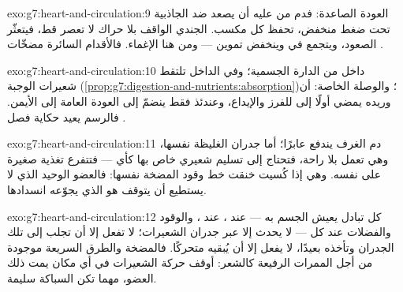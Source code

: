 \begin{solution}{exo:g7:heart-and-circulation:9}
العودة الصاعدة: فدم  من  عليه أن يصعد ضد الجاذبية
تحت ضغط منخفض،  تحفظ كل مكسب.   الجندي الواقف
بلا حراك لا تعصر  قط، فيتعثّر الصعود، ويتجمع  في
 وينخفض تموين  --- ومن هنا الإغماء. فالأقدام السائرة
مضخّات .
\end{solution}

\begin{solution}{exo:g7:heart-and-circulation:10}
 داخل من الدارة الجسمية؛ وفي الداخل تلتقط شعيرات 
 الوجبة
(\cref{prop:g7:digestion-and-nutrients:absorption})؛ والوصلة
الخاصة: أن وريده يمضي أولًا إلى  للفرز والإيداع، وعندئذ فقط
ينضمّ  إلى العودة العامة إلى  الأيمن. فالرسم يعيد حكاية
فصل .
\end{solution}

\begin{solution}{exo:g7:heart-and-circulation:11}
دم الغرف يندفع عابرًا؛ أما جدران  الغليظة نفسها، وهي تعمل بلا
راحة، فتحتاج إلى تسليم شعيري خاص بها كأي  --- فتتفرع 
تغذية صغيرة على  نفسه. وهي إذا كُسيت خنقت خط وقود المضخة
نفسها: فالعضو الوحيد الذي لا يستطيع أن يتوقف هو الذي يجوّعه
انسدادها.
\end{solution}

\begin{solution}{exo:g7:heart-and-circulation:12}
كل تبادل يعيش الجسم به ---  عند ،  عند
، والوقود والفضلات عند كل  --- لا يحدث إلا عبر جدران
الشعيرات؛   لا تفعل إلا أن تجلب  إلى تلك
الجدران وتأخذه بعيدًا،  لا يفعل إلا أن يُبقيه متحركًا.
فالمضخة والطرق السريعة موجودة من أجل الممرات الرفيعة كالشعر: أوقف
حركة الشعيرات في أي مكان يمت ذلك العضو، مهما تكن السباكة سليمة.
\end{solution}

